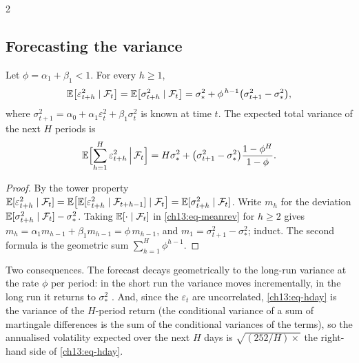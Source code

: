 \begin{paracol}{2}
\subsection{Forecasting the variance}\label{ch13:sec-forecast}
\begin{theorem}\label{ch13:thm-forecast}
Let $\phi=\alpha_1+\beta_1<1$. For every $h\ge1$,
\begin{equation}\label{ch13:eq-forecast}
  \mathbb{E}\bigl[\varepsilon_{t+h}^2\mid\mathcal F_t\bigr]=\mathbb{E}\bigl[\sigma^2_{t+h}\mid\mathcal F_t\bigr]=\sigma_*^2+\phi^{\,h-1}\bigl(\sigma_{t+1}^2-\sigma_*^2\bigr),
\end{equation}
where $\sigma_{t+1}^2=\alpha_0+\alpha_1\varepsilon_t^2+\beta_1\sigma_t^2$ is known at time $t$. The expected total variance of the next $H$ periods is
\begin{equation}\label{ch13:eq-hday}
  \mathbb{E}\Bigl[\sum_{h=1}^H\varepsilon^2_{t+h}\,\Big|\,\mathcal F_t\Bigr]=H\sigma_*^2+\bigl(\sigma_{t+1}^2-\sigma_*^2\bigr)\frac{1-\phi^H}{1-\phi}.
\end{equation}
\end{theorem}
\begin{proof}
By the tower property $\mathbb{E}[\varepsilon^2_{t+h}\mid\mathcal F_t]=\mathbb{E}\bigl[\mathbb{E}[\varepsilon^2_{t+h}\mid\mathcal F_{t+h-1}]\mid\mathcal F_t\bigr]=\mathbb{E}[\sigma^2_{t+h}\mid\mathcal F_t]$. Write $m_h$ for the deviation
$\mathbb{E}[\sigma^2_{t+h}\mid\mathcal F_t]-\sigma_*^2$. Taking $\mathbb{E}[\cdot\mid\mathcal F_t]$ in \eqref{ch13:eq-meanrev} for $h\ge2$ gives $m_h=\alpha_1m_{h-1}+\beta_1m_{h-1}=\phi\,m_{h-1}$, and $m_1=\sigma^2_{t+1}-\sigma_*^2$; induct.
The second formula is the geometric sum $\sum_{h=1}^H\phi^{h-1}$.
\end{proof}
Two consequences. The forecast decays geometrically to the long-run variance at the rate $\phi$ per period: in the short run the variance moves incrementally, in the long run it returns to $\sigma_*^2$
. And, since the $\varepsilon_t$ are uncorrelated, \eqref{ch13:eq-hday} is the variance of the $H$-period return (the conditional variance of a sum of martingale differences is the sum of the conditional variances of the terms), so
the annualised volatility expected over the next $H$ days is $\sqrt{(252/H)\times}$ the right-hand side of \eqref{ch13:eq-hday}.


\end{paracol}
